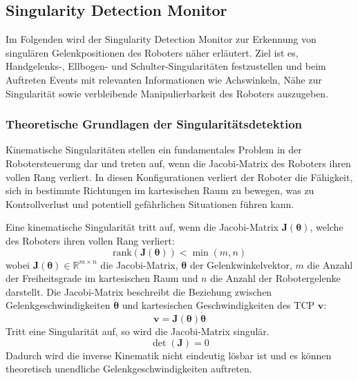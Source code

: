 \subsection{Singularity Detection Monitor} \label{ssec:Singularitaeten}
Im Folgenden wird der Singularity Detection Monitor zur Erkennung von
singulären Gelenkpositionen des Roboters näher erläutert. Ziel ist es,
Handgelenks-, Ellbogen- und Schulter-Singularitäten festzustellen und beim
Auftreten Events mit relevanten Informationen wie Achswinkeln, Nähe zur
Singularität sowie verbleibende Manipulierbarkeit des Roboters auszugeben.

\subsubsection{Theoretische Grundlagen der Singularitätsdetektion}
\label{sssec:Theorie_Singularitaeten}
Kinematische Singularitäten stellen ein fundamentales Problem in der
Robotersteuerung dar und treten auf, wenn die Jacobi-Matrix des Roboters ihren
vollen Rang verliert. In diesen Konfigurationen verliert der Roboter die
Fähigkeit, sich in bestimmte Richtungen im kartesischen Raum zu bewegen, was zu
Kontrollverlust und potentiell gefährlichen Situationen führen
kann.

Eine kinematische Singularität tritt auf,
wenn die Jacobi-Matrix $\mathbf{J}(\boldsymbol{\theta})$, welche des Roboters
ihren vollen Rang verliert:
\begin{equation}
  \text{rank}(\mathbf{J}(\boldsymbol{\theta})) < \min(m, n)
  \label{eq:singularity_condition}
\end{equation} wobei
$\mathbf{J}(\boldsymbol{\theta}) \in \mathbb{R}^{m \times n}$ die Jacobi-Matrix,
$\boldsymbol{\theta}$ der Gelenkwinkelvektor, $m$ die Anzahl der Freiheitsgrade
im kartesischen Raum und $n$ die Anzahl der Robotergelenke darstellt.
\noindent
Die Jacobi-Matrix beschreibt die Beziehung zwischen Gelenkgeschwindigkeiten
$\dot{\boldsymbol{\theta}}$ und kartesischen Geschwindigkeiten des TCP
$\mathbf{v}$:
\begin{equation} \mathbf{v} = \mathbf{J}(\boldsymbol{\theta})
  \dot{\boldsymbol{\theta}} \label{eq:jacobian_velocity}
\end{equation}
\noindent
Tritt eine Singularität auf, so wird die Jacobi-Matrix singulär.
\begin{equation} \det(\mathbf{J}) = 0 \label{eq:jacobian_singularity}
\end{equation} Dadurch wird die inverse Kinematik nicht
eindeutig lösbar ist und es können theoretisch unendliche
Gelenkgeschwindigkeiten auftreten.

